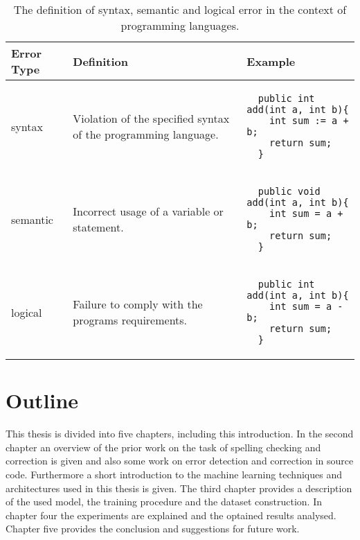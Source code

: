 \begin{table}[t!]
\begin{tabular}{ | m{2cm}  m{35mm}  m{55mm} | }
  \hline
  Error Type & Definition & Example \\
  \hline
  syntax &
  Violation of the specified syntax of the programming language. &
  \begin{lstlisting}
  public int add(int a, int b){
    int sum := a + b;
    return sum;
  }
  \end{lstlisting}
  \\
  semantic &
  Incorrect usage of a variable or statement. &
  \begin{lstlisting}
  public void add(int a, int b){
    int sum = a + b;
    return sum;
  }
  \end{lstlisting}
  \\
  logical &
  Failure to comply with the programs requirements. &
  \begin{lstlisting}
  public int add(int a, int b){
    int sum = a - b;
    return sum;
  }
  \end{lstlisting}
  \\
  \hline
\end{tabular}
\caption{The definition of syntax, semantic and logical error in the context of programming languages.}
\label{error_table}
\end{table}

\section{Outline}

This thesis is divided into five chapters, including this introduction. In the second chapter an overview of the prior work on the task of spelling checking and correction is given and also some work on error detection and correction in source code. Furthermore a short introduction to the machine learning techniques and architectures used in this thesis is given. The third chapter provides a description of the used model, the training procedure and the dataset construction. In chapter four the experiments are explained and the optained results analysed. Chapter five provides the conclusion and suggestions for future work.
